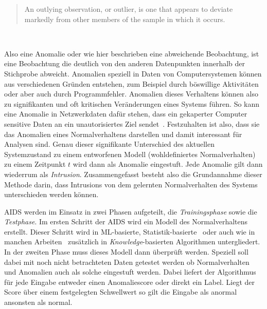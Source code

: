                 \blockquote{An outlying observation, or outlier, is one that appears to deviate markedly from other members of the sample in which it occurs.}~\cite{ANOMALYDEFINITION1969}

                Also eine Anomalie oder wie hier beschrieben eine abweichende Beobachtung, ist eine Beobachtung die deutlich von den anderen Datenpunkten innerhalb der Stichprobe abweicht.
                Anomalien speziell in Daten von Computersystemen können aus verschiedenen Gründen entstehen, zum Beispiel durch böswillige Aktivitäten oder aber auch durch Programmfehler.
                Anomalien dieses Verhaltens können also zu signifikanten und oft kritischen Veränderungen eines Systems führen.
                So kann eine Anomalie in Netzwerkdaten dafür stehen, dass ein gekaperter Computer sensitive Daten an ein unautorisiertes Ziel sendet~\cite{ANOMALYEXAMPLE}.
                Festzuhalten ist also, dass sie das Anomalien eines  Normalverhaltens darstellen und damit interessant für Analysen sind.
                Genau dieser signifikante Unterschied des aktuellen Systemzustand zu einem entworfenen Modell (wohldefiniertes Normalverhalten) zu einem Zeitpunkt $t$ wird dann als Anomalie eingestuft.
                Jede Anomalie gilt dann wiederrum als \textit{Intrusion}.
                Zusammengefasst besteht also die Grundannahme dieser Methode darin, dass Intrusions von dem gelernten Normalverhalten des Systems unterschieden werden können.


                \ac{AIDS} werden im Einsatz in zwei Phasen aufgeteilt, die \textit{Trainingsphase} sowie die \textit{Testphase}.
                Im ersten Schritt der \ac{AIDS} wird ein Modell des Normalverhaltens erstellt.
                Dieser Schritt wird in \ac{ML}-basierte, Statistik-basierte~\cite{IDSPIETRO2008} oder auch 
                wie in manchen Arbeiten~\cite{IDSsurvey} zusätzlich in \textit{Knowledge}-basierten  Algorithmen untergliedert.
                In der zweiten Phase muss dieses Modell dann überprüft werden.
                Speziell soll dabei mit noch nicht betrachteten Daten getestet werden ob Normalverhalten und Anomalien auch als solche eingestuft werden.
                Dabei liefert der Algorithmus für jede Eingabe entweder einen Anomaliescore oder direkt ein Label.
                Liegt der Score über einem festgelegten Schwellwert so gilt die Eingabe als anormal ansonsten als normal.~\cite{IDSPIETRO2008}

